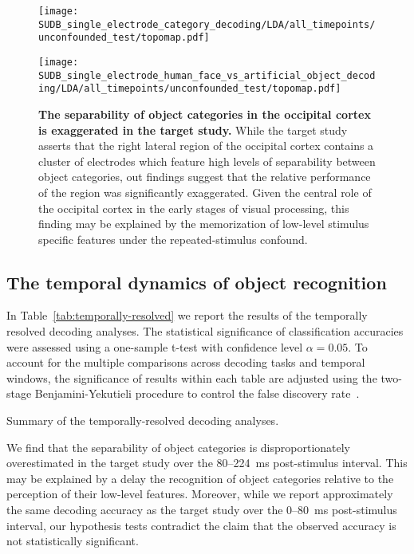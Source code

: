 \begin{figure}
    \centering
    \begin{minipage}{0.45\columnwidth} 
    \texttt{[image: SUDB\_single\_electrode\_category\_decoding/LDA/all\_timepoints/unconfounded\_test/topomap.pdf]}
    \end{minipage}
    \hfill
    \begin{minipage}{0.45\columnwidth} 
    \texttt{[image: SUDB\_single\_electrode\_human\_face\_vs\_artificial\_object\_decoding/LDA/all\_timepoints/unconfounded\_test/topomap.pdf]}
    \end{minipage}  
    \caption{\textbf{The separability of object categories in the occipital cortex is exaggerated in the target study.} While the target study asserts that the right lateral region of the occipital cortex contains a cluster of electrodes which feature high levels of separability between object categories, out findings suggest that the relative performance of the region was significantly exaggerated. Given the central role of the occipital cortex in the early stages of visual processing, this finding may be explained by the memorization of low-level stimulus specific features under the repeated-stimulus confound.  
    \label{fig:category-topomaps}}
\end{figure}

\subsection{The temporal dynamics of object recognition}
In Table~\ref{tab:temporally-resolved} we report the results of the temporally resolved decoding analyses. The statistical significance of classification accuracies were assessed using a one-sample t-test with confidence level \(\alpha=0.05\). To account for the multiple comparisons across decoding tasks and temporal windows, the significance of results within each table are adjusted using the two-stage Benjamini-Yekutieli procedure to control the false discovery rate~\citep{Benjamini:2006}.

\begin{table}[b]
    \caption{Summary of the temporally-resolved decoding analyses.\label{tab:temporally-resolved}}
        
\end{table}

We find that the separability of object categories is disproportionately overestimated in the target study over the 80--224~ms post-stimulus interval. This may be explained by a delay the recognition of object categories relative to the perception of their low-level features. Moreover, while we report approximately the same decoding accuracy as the target study over the 0--80~ms post-stimulus interval, our hypothesis tests contradict the claim that the observed accuracy is not statistically significant.

